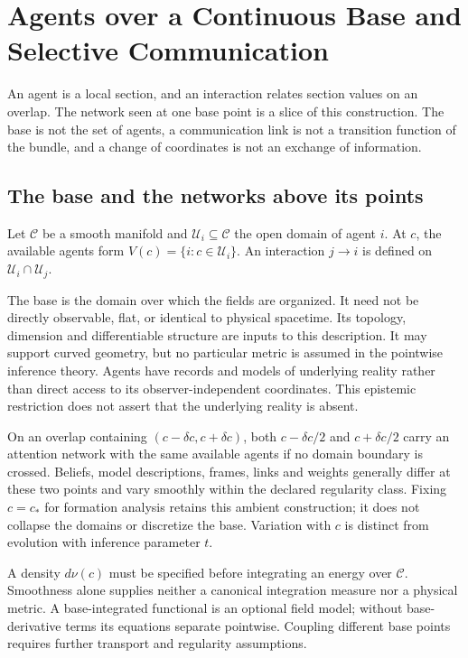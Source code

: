 \section{Agents over a Continuous Base and Selective Communication}\label{sec:one_rung}

An agent is a local section, and an interaction relates section values on an overlap. The network seen at one base point is a slice of this construction. The base is not the set of agents, a communication link is not a transition function of the bundle, and a change of coordinates is not an exchange of information.

\subsection{The base and the networks above its points}\label{sec:flat_base}
\begin{definition}\label{def:base_manifold}
Let $\mathcal C$ be a smooth manifold and $\mathcal U_i\subseteq\mathcal C$ the open domain of agent $i$. At $c$, the available agents form $V(c)=\{i:c\in\mathcal U_i\}$. An interaction $j\to i$ is defined on $\mathcal U_i\cap\mathcal U_j$.
\end{definition}
The base is the domain over which the fields are organized. It need not be directly observable, flat, or identical to physical spacetime. Its topology, dimension and differentiable structure are inputs to this description. It may support curved geometry, but no particular metric is assumed in the pointwise inference theory. Agents have records and models of underlying reality rather than direct access to its observer-independent coordinates. This epistemic restriction does not assert that the underlying reality is absent.

On an overlap containing $(c-\delta c,c+\delta c)$, both $c-\delta c/2$ and $c+\delta c/2$ carry an attention network with the same available agents if no domain boundary is crossed. Beliefs, model descriptions, frames, links and weights generally differ at these two points and vary smoothly within the declared regularity class. Fixing $c=c_*$ for formation analysis retains this ambient construction; it does not collapse the domains or discretize the base. Variation with $c$ is distinct from evolution with inference parameter $t$.

A density $d\nu(c)$ must be specified before integrating an energy over $\mathcal C$. Smoothness alone supplies neither a canonical integration measure nor a physical metric. A base-integrated functional is an optional field model; without base-derivative terms its equations separate pointwise. Coupling different base points requires further transport and regularity assumptions.

